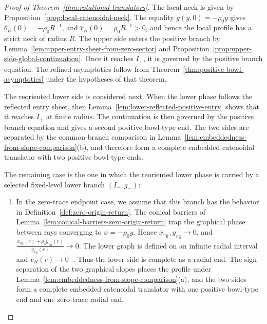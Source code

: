 \documentclass{amsart}
\theoremstyle{plain}
\theoremstyle{mainintrothm}
\theoremstyle{definition}
\begin{document}
\begin{proof}[Proof of Theorem~\ref{thm:rotational-translators}]
	The local neck is given by
	Proposition~\ref{prop:local-catenoidal-neck}.  The equality
	$g(y,0)=-\rho_0y$ gives $\dot\theta_R(0)=-\rho_0R^{-1}$,
	and $\ddot r_R(0)=\rho_0R^{-1}>0$, and hence the local profile has a strict neck of radius $R$.  The upper side
	enters the positive branch by
	Lemma~\ref{lem:upper-entry-sheet-from-zero-sector} and
	Proposition~\ref{prop:upper-side-global-continuation}.  Once it reaches
	$I_+$, it is governed by the positive branch equation.  The refined
	asymptotics follow from
	Theorem~\ref{thm:positive-bowl-asymptotics} under the hypotheses of that
	theorem.
	
	\medskip
	
	The reoriented lower side is considered next.  When the lower phase follows the
	reflected entry sheet, then
	Lemma~\ref{lem:lower-reflected-positive-entry} shows that it reaches
	$I_+$ at finite radius.  The continuation is then governed by the positive
	branch equation and gives a second positive bowl-type end.  The two sides
	are separated by the common-branch comparison in
	Lemma~\ref{lem:embeddedness-from-slope-comparison}\textup{(b)}, and
	therefore form a complete embedded catenoidal translator with two positive
	bowl-type ends.
	
	\medskip
	
	The remaining case is the one in which the reoriented lower phase is
	carried by a selected fixed-level lower branch $(I_-,g_-)$:
	\begin{enumerate}
		\item 	In the zero-trace endpoint case, we assume that this branch has the behavior in
		Definition~\ref{def:zero-origin-return}.  The conical barriers of
		Lemma~\ref{lem:conical-barriers-zero-origin-return} trap the graphical phase
		between rays converging to $x=-\rho_0y$.  Hence $x_{v_R^-},y_{v_R^{-}}\to0$,
		and $\frac{x_{v_R^-}(r)+\rho_0y_{v_R^-}(r)}{y_{v_R^-}(r)}\to0$. The lower graph is defined on an infinite radial interval and $v_R^-(r)\to0^-$.  Thus the lower side is complete as a radial end. The	sign separation of the two graphical slopes places the profile under Lemma~\ref{lem:embeddedness-from-slope-comparison}\textup{(a)}, and the two	 sides form a complete embedded catenoidal translator with one positive
		bowl-type end and one zero-trace radial end.
		

\end{enumerate}
\end{proof}
\end{document}
